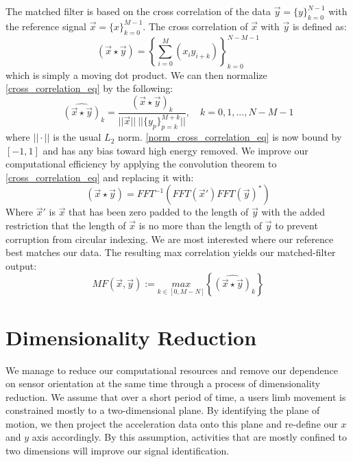 \documentclass[journal]{IEEEtran}
\begin{document}
The matched filter is based on the cross correlation of the data $\vec{y} = \{y\}_{k=0}^{N-1}$ with the reference signal $\vec{x} = \{x\}_{k=0}^{M-1}$.
The cross correlation of $\vec{x}$ with $\vec{y}$ is defined as:
%
\begin{equation} \label{cross_correlation_eq}
(\vec{x} \star \vec{y}) = \left \{\sum_{i=0}^{M}(x_{i} y_{i+k}) \right \}_{k=0}^{N-M-1}
\end{equation}
%
which is simply a moving dot product.
We can then normalize \eqref{cross_correlation_eq} by the following:
%
\begin{equation} \label{norm_cross_correlation_eq}
\widehat{(\vec{x} \star \vec{y})}_k = \frac{(\vec{x} \star \vec{y})_k}{||\vec{x}|| \ || \{y_p\}_{p=k}^{M+k} || }, \quad k = 0,1,...,N-M-1
\end{equation}
%
where $|| \cdot ||$ is the usual $L_2$ norm. \eqref{norm_cross_correlation_eq} is now bound by $[-1,1]$ and has any bias toward high energy removed.
We improve our computational efficiency by applying the convolution theorem to \eqref{cross_correlation_eq} and replacing it with:
%
\begin{equation} \label{conv_theorem}
(\vec{x} \star \vec{y}) = FFT^{-1}(FFT(\vec{x}') FFT(\vec{y})^*)
\end{equation}
%
Where $\vec{x}'$ is $\vec{x}$ that has been zero padded to the length of $\vec{y}$ with the added restriction that the length of $\vec{x}$ is no more than the length of $\vec{y}$ to prevent corruption from circular indexing.
We are most interested where our reference best matches our data.
The resulting max correlation yields our matched-filter output:
%
\begin{equation} \label{matched_filter_eq}
MF(\vec{x},\vec{y}) := \underset{k \in [0, M-N]}{max} \left \{\widehat{(\vec{x} \star \vec{y})}_k \right \}
\end{equation}
%
\section{Dimensionality Reduction}
We manage to reduce our computational resources and remove our dependence on sensor orientation at the same time through a process of dimensionality reduction.
We assume that over a short period of time, a user\textquotesingle s limb movement is constrained mostly to a two-dimensional plane.
By identifying the plane of motion, we then project the acceleration data onto this plane and re-define our $x$ and $y$ axis accordingly.
By this assumption, activities that are mostly confined to two dimensions will improve our signal identification.
\end{document}
